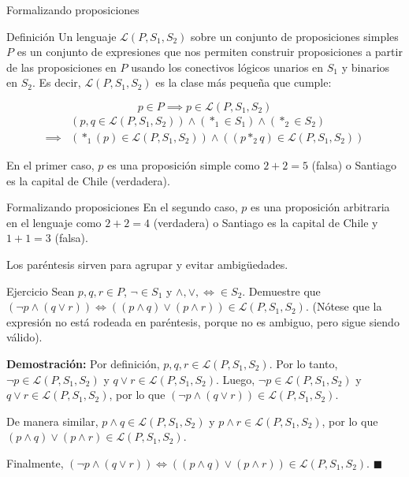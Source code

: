 \documentclass[dvisvgm,hypertex,aspectratio=169]{beamer}
\begin{document}
\begin{frame}{Formalizando proposiciones}
  \begin{block}{Definición}
    Un lenguaje $\mathcal{L}(P, S_1, S_2)$ sobre un conjunto de proposiciones simples $P$ es un conjunto de expresiones que nos permiten construir proposiciones a partir de las proposiciones en $P$
    usando los conectivos lógicos unarios en $S_1$ y binarios en $S_2$. Es decir, $\mathcal{L}(P, S_1, S_2)$ es la clase más pequeña que cumple:

    \pause
    $$p\in P\implies p\in\mathcal{L}(P, S_1, S_2)$$
    \begin{align*}
      &(p,q\in\mathcal{L}(P, S_1, S_2))\land(*_1\in S_1)\land(*_2\in S_2) \\
      \implies&(*_1(p)\in\mathcal{L}(P, S_1, S_2))\land((p*_2q)\in\mathcal{L}(P, S_1, S_2))
    \end{align*}
  \end{block}
  \pause
  En el primer caso, $p$ es una proposición simple como $2+2=5$ (falsa) o Santiago es la capital de Chile (verdadera).
\end{frame}
\begin{frame}{Formalizando proposiciones}
  En el segundo caso, $p$ es una proposición arbitraria en el lenguaje como $2+2=4$ (verdadera) o Santiago es la capital de Chile y $1+1=3$ (falsa).

  \pause
  Los paréntesis sirven para agrupar y evitar ambigüedades.
\end{frame}
\begin{frame}{Ejercicio}
  Sean $p, q, r\in P$, $\neg\in S_1$ y $\land,\lor,\iff\in S_2$. Demuestre que $(\neg p\land(q\lor r))\iff((p\land q)\lor(p\land r))\in\mathcal{L}(P, S_1, S_2)$. (Nótese que la expresión no está rodeada en paréntesis, porque no es ambiguo, pero sigue siendo válido).

  \pause
  \textbf{Demostración:} Por definición, $p, q, r\in\mathcal{L}(P, S_1, S_2)$. Por lo tanto, $\neg p\in\mathcal{L}(P, S_1, S_2)$ y $q\lor r\in\mathcal{L}(P, S_1, S_2)$. Luego, $\neg p\in\mathcal{L}(P, S_1, S_2)$ y $q\lor r\in\mathcal{L}(P, S_1, S_2)$, por lo que $(\neg p\land(q\lor r))\in\mathcal{L}(P, S_1, S_2)$.

  \pause De manera similar, $p\land q\in\mathcal{L}(P, S_1, S_2)$ y $p\land r\in\mathcal{L}(P, S_1, S_2)$, por lo que $(p\land q)\lor(p\land r)\in\mathcal{L}(P, S_1, S_2)$.
  
  \pause Finalmente, $(\neg p\land(q\lor r))\iff((p\land q)\lor(p\land r))\in\mathcal{L}(P, S_1, S_2)$. $\blacksquare$
\end{frame}
\end{document}
